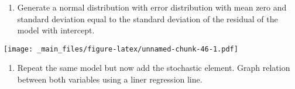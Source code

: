 \documentclass[
]{book}
\newenvironment{Shaded}{\begin{snugshade}}{\end{snugshade}}
\newcommand{\AttributeTok}[1]{\textcolor[rgb]{0.13,0.29,0.53}{#1}}
\newcommand{\DecValTok}[1]{\textcolor[rgb]{0.00,0.00,0.81}{#1}}
\newcommand{\FunctionTok}[1]{\textcolor[rgb]{0.13,0.29,0.53}{\textbf{#1}}}
\newcommand{\NormalTok}[1]{#1}
\newcommand{\OtherTok}[1]{\textcolor[rgb]{0.56,0.35,0.01}{#1}}
\newcommand{\SpecialCharTok}[1]{\textcolor[rgb]{0.81,0.36,0.00}{\textbf{#1}}}
\newcommand{\StringTok}[1]{\textcolor[rgb]{0.31,0.60,0.02}{#1}}
\providecommand{\tightlist}{%
  \setlength{\itemsep}{0pt}\setlength{\parskip}{0pt}}
\begin{document}
\begin{enumerate}
\def\labelenumi{\roman{enumi}.}
\tightlist
\item
  Generate a normal distribution with error distribution with mean zero and standard deviation equal to the standard deviation of the residual of the model with intercept.
\end{enumerate}

\begin{Shaded}
\end{Shaded}

\texttt{[image: \_main\_files/figure-latex/unnamed-chunk-46-1.pdf]}

\begin{enumerate}
\def\labelenumi{\roman{enumi}.}
\tightlist
\item
  Repeat the same model but now add the stochastic element. Graph relation between both variables using a liner regression line.
\end{enumerate}
\end{document}
